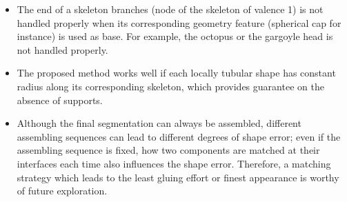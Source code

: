\begin{itemize}
 \item  The end of a skeleton branches (node of the skeleton of valence 1) is not handled properly when its corresponding geometry feature (spherical cap for instance) is used as base. For example, the octopus or the gargoyle head is not handled properly.
 \item The proposed method works well if each locally tubular shape has constant radius along its corresponding skeleton, which provides guarantee on the absence of supports.
 \item Although the final segmentation can always be assembled, different assembling sequences can lead to different degrees of shape error; even if the assembling sequence is fixed, how two components are matched at their interfaces each time also influences the shape error. Therefore, a matching strategy which leads to the least gluing effort or finest appearance is worthy of future exploration.

\end{itemize}

